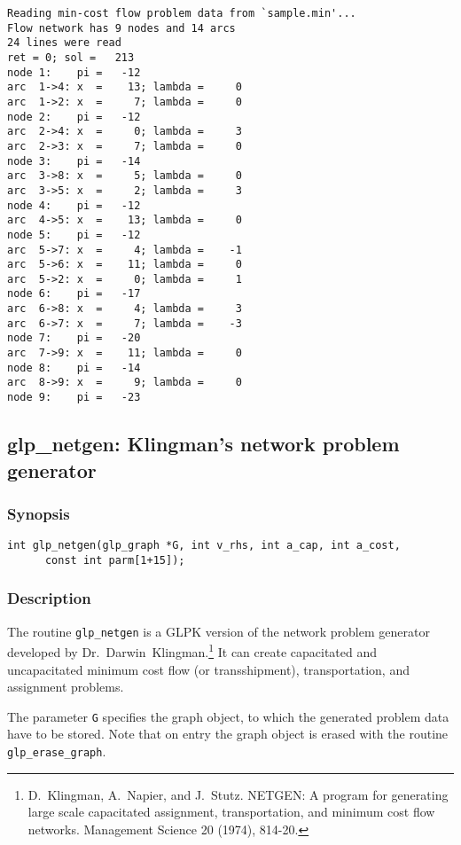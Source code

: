 \begin{verbatim}
Reading min-cost flow problem data from `sample.min'...
Flow network has 9 nodes and 14 arcs
24 lines were read
ret = 0; sol =   213
node 1:    pi =   -12
arc  1->4: x  =    13; lambda =     0
arc  1->2: x  =     7; lambda =     0
node 2:    pi =   -12
arc  2->4: x  =     0; lambda =     3
arc  2->3: x  =     7; lambda =     0
node 3:    pi =   -14
arc  3->8: x  =     5; lambda =     0
arc  3->5: x  =     2; lambda =     3
node 4:    pi =   -12
arc  4->5: x  =    13; lambda =     0
node 5:    pi =   -12
arc  5->7: x  =     4; lambda =    -1
arc  5->6: x  =    11; lambda =     0
arc  5->2: x  =     0; lambda =     1
node 6:    pi =   -17
arc  6->8: x  =     4; lambda =     3
arc  6->7: x  =     7; lambda =    -3
node 7:    pi =   -20
arc  7->9: x  =    11; lambda =     0
node 8:    pi =   -14
arc  8->9: x  =     9; lambda =     0
node 9:    pi =   -23
\end{verbatim}

\newpage

\subsection{glp\_netgen: Klingman's network problem generator}

\subsubsection*{Synopsis}

\begin{verbatim}
int glp_netgen(glp_graph *G, int v_rhs, int a_cap, int a_cost,
      const int parm[1+15]);
\end{verbatim}

\subsubsection*{Description}

The routine \verb|glp_netgen| is a GLPK version of the network problem
generator developed by Dr.~Darwin~Klingman.\footnote{D.~Klingman,
A.~Napier, and J.~Stutz. NETGEN: A program for generating large scale
capacitated assignment, transportation, and minimum cost flow networks.
Management Science 20 (1974), 814-20.} It can create capacitated and
uncapacitated minimum cost flow (or transshipment), transportation, and
assignment problems.

The parameter \verb|G| specifies the graph object, to which the
generated  problem data have to be stored. Note that on entry the graph
object  is erased with the routine \verb|glp_erase_graph|.

